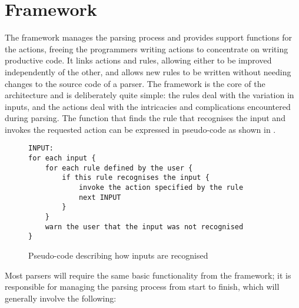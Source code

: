 \section{Framework}

\label{framework in architecture}

The framework manages the parsing process and provides support functions
for the actions, freeing the programmers writing actions to concentrate on
writing productive code.  It links actions and rules, allowing either to be
improved independently of the other, and allows new rules to be written
without needing changes to the source code of a parser.  The framework is
the core of the architecture and is deliberately quite simple: the rules
deal with the variation in inputs, and the actions deal with the
intricacies and complications encountered during parsing.  The function
that finds the rule that recognises the input and invokes the requested
action can be expressed in pseudo-code as shown in .

\begin{figure}[thbp]
    \caption{Pseudo-code describing how inputs are recognised}
    \empty{}\label{Pseudo-code describing how inputs are recognised}
\begin{verbatim}
INPUT:
for each input {
    for each rule defined by the user {
        if this rule recognises the input {
            invoke the action specified by the rule
            next INPUT
        }
    }
    warn the user that the input was not recognised
}
\end{verbatim}
\end{figure}

Most parsers will require the same basic functionality from the framework;
it is responsible for managing the parsing process from start to finish,
which will generally involve the following:

